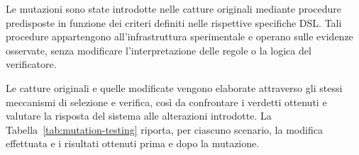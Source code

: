 Le mutazioni sono state introdotte nelle catture originali mediante procedure predisposte in funzione dei criteri definiti nelle rispettive specifiche DSL. Tali procedure appartengono all'infrastruttura sperimentale e operano sulle evidenze osservate, senza modificare l'interpretazione delle regole o la logica del verificatore.

Le catture originali e quelle modificate vengono elaborate attraverso gli stessi meccanismi di selezione e verifica, così da confrontare i verdetti ottenuti e valutare la risposta del sistema alle alterazioni introdotte. La Tabella~\ref{tab:mutation-testing} riporta, per ciascuno scenario, la modifica effettuata e i risultati ottenuti prima e dopo la mutazione.

\begingroup
\footnotesize
\setlength{\tabcolsep}{3pt}
\renewcommand{\arraystretch}{1.25}

